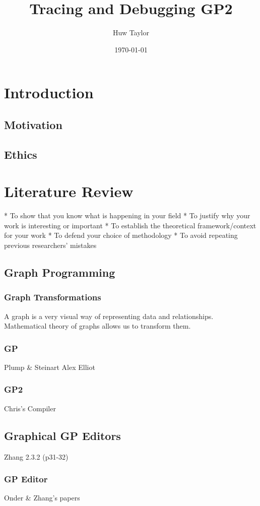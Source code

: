 \documentclass{UoYCSproject}
\author{Huw Taylor}
\title{Tracing and Debugging GP2}
\date{\today}
\begin{document}
\maketitle
\tableofcontents
\listoffigures

\chapter{Introduction}
\section{Motivation}
\section{Ethics}

\chapter{Literature Review}
 * To show that you know what is happening in your field 
 * To justify why your work is interesting or important 
 * To establish the theoretical framework/context for your work 
 * To defend your choice of methodology 
 * To avoid repeating previous researchers’ mistakes
\section{Graph Programming}
\subsection{Graph Transformations}
A graph is a very visual way of representing data and relationships. 
Mathematical theory of graphs allows us to transform them.
\subsection{GP}
Plump & Steinart
Alex Elliot
\subsection{GP2}
Chris's Compiler
\section{Graphical GP Editors}
Zhang 2.3.2 (p31-32)
\subsection{GP Editor}
Onder & Zhang's papers
\end{document}
